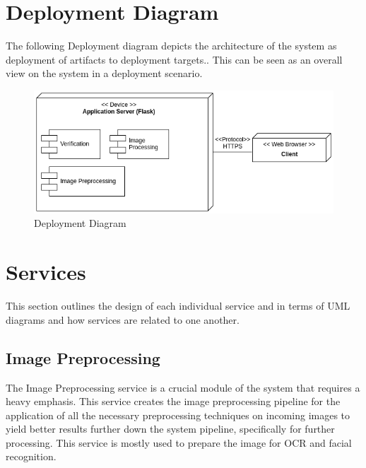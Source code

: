 \documentclass{article}
\begin{document}
\section{Deployment Diagram}
The following Deployment diagram depicts the architecture of the system as deployment of artifacts to deployment targets.. This can be seen as an overall view on the system in a deployment scenario.
\begin{figure}[h]
	    	\centering
	    	\includegraphics[scale=0.5]{img/Quant.png}
	    	\caption{Deployment Diagram}
	    \end{figure}
	    \pagebreak
	 
\section{Services}
This section outlines the design of each individual service and in terms of UML diagrams and how services are related to one another.

\subsection{Image Preprocessing}
The Image Preprocessing service is a crucial module of the system that requires a heavy emphasis. This service creates the image preprocessing pipeline for the application of all the necessary preprocessing techniques on incoming images to yield better results further down the system pipeline, specifically for further processing. This service is mostly used to prepare the image for OCR and facial recognition. 
\end{document}

